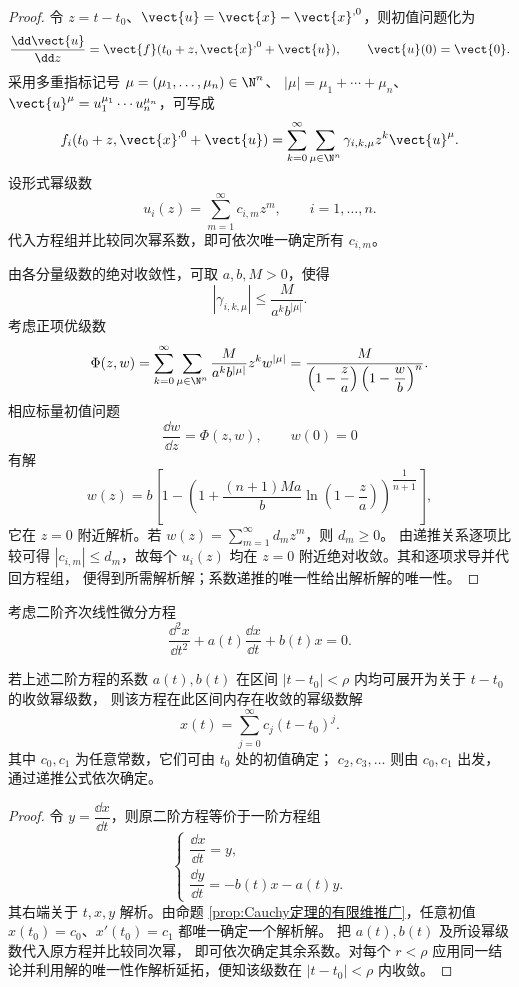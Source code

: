 \begin{proof}
	令 $z=t-t_0$、$\vect{u}=\vect{x}-\vect{x}^{,0}$，则初值问题化为
	\[
		\dfrac{\dd\vect{u}}{\dd z}
		=\vect{f}(t_0+z,\vect{x}^{,0}+\vect{u}),
		\qquad \vect{u}(0)=\vect{0}.
	\]
	采用多重指标记号
	$\mu=(\mu_1,\ldots,\mu_n)\in\N^n$、
	$|\mu|=\mu_1+\cdots+\mu_n$、
	$\vect{u}^{\mu}=u_1^{\mu_1}\cdots u_n^{\mu_n}$，可写成
	\[
		f_i(t_0+z,\vect{x}^{,0}+\vect{u})
		=\sum_{k=0}^{\infty}\sum_{\mu\in\N^n}
		\gamma_{i,k,\mu}z^k\vect{u}^{\mu}.
	\]
	设形式幂级数
	\[
		u_i(z)=\sum_{m=1}^{\infty}c_{i,m}z^m,
		\qquad i=1,\ldots,n.
	\]
	代入方程组并比较同次幂系数，即可依次唯一确定所有 $c_{i,m}$。

	由各分量级数的绝对收敛性，可取 $a,b,M>0$，使得
	\[
		|\gamma_{i,k,\mu}|
		\leq\dfrac{M}{a^k b^{|\mu|}}.
	\]
	考虑正项优级数
	\[
		\Phi(z,w)
		=\sum_{k=0}^{\infty}\sum_{\mu\in\N^n}
		\dfrac{M}{a^k b^{|\mu|}}z^kw^{|\mu|}
		=\dfrac{M}{\left(1-\dfrac{z}{a}\right)
		\left(1-\dfrac{w}{b}\right)^n}.
	\]
	相应标量初值问题
	\[
		\dfrac{\dd w}{\dd z}=\Phi(z,w),
		\qquad w(0)=0
	\]
	有解
	\[
		w(z)=b\left[
		1-\left(
		1+\dfrac{(n+1)Ma}{b}\ln\left(1-\dfrac{z}{a}\right)
		\right)^{\!\dfrac{1}{n+1}}
		\right],
	\]
	它在 $z=0$ 附近解析。若
	$w(z)=\sum_{m=1}^{\infty}d_mz^m$，则 $d_m\geq0$。
	由递推关系逐项比较可得 $|c_{i,m}|\leq d_m$，故每个
	$u_i(z)$ 均在 $z=0$ 附近绝对收敛。其和逐项求导并代回方程组，
	便得到所需解析解；系数递推的唯一性给出解析解的唯一性。
\end{proof}

考虑二阶齐次线性微分方程
\[
	\dfrac{\dd^2x}{\dd t^2}
	+a(t)\dfrac{\dd x}{\dd t}+b(t)x=0.
\]

\begin{proposition}\label{thm:二阶解析系数方程的幂级数解}
	若上述二阶方程的系数 $a(t),b(t)$
	在区间 $|t-t_0|<\rho$ 内均可展开为关于 $t-t_0$ 的收敛幂级数，
	则该方程在此区间内存在收敛的幂级数解
	\[
		x(t)=\sum_{j=0}^{\infty}c_j(t-t_0)^j.
	\]
	其中 $c_0,c_1$ 为任意常数，它们可由 $t_0$ 处的初值确定；
	$c_2,c_3,\ldots$ 则由 $c_0,c_1$ 出发，通过递推公式依次确定。
\end{proposition}

\begin{proof}
	令 $y=\dfrac{\dd x}{\dd t}$，则原二阶方程等价于一阶方程组
	\[
		\begin{cases}
			\dfrac{\dd x}{\dd t}=y,\\[6pt]
			\dfrac{\dd y}{\dd t}=-b(t)x-a(t)y.
		\end{cases}
	\]
	其右端关于 $t,x,y$ 解析。由命题
	\ref{prop:Cauchy定理的有限维推广}，任意初值
	$x(t_0)=c_0$、$x'(t_0)=c_1$ 都唯一确定一个解析解。
	把 $a(t),b(t)$ 及所设幂级数代入原方程并比较同次幂，
	即可依次确定其余系数。对每个
	$r<\rho$ 应用同一结论并利用解的唯一性作解析延拓，便知该级数在
	$|t-t_0|<\rho$ 内收敛。
\end{proof}

